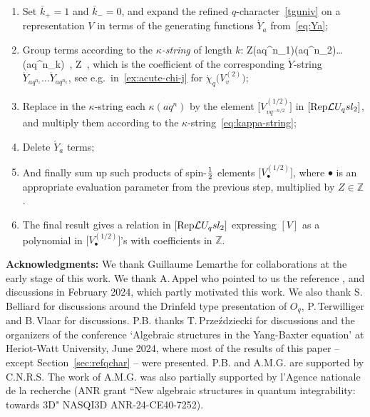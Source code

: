 \documentclass[11pt]{amsart}
\numberwithin{equation}{section}
\numberwithin{equation}{section}
\begin{document}
  \begin{enumerate}
      \item Set $\bar{k}_+=1$ and $\bar{k}_-=0$, and expand the refined $q$-character~\eqref{tguniv} on a representation $V$ in terms of the generating functions $\acute{Y}_a$ from~\eqref{eq:Ya};
      
      \item Group terms according to the \textit{$\kappa$-string} of length $k$: 
      \beq\label{eq:kappa-string}
      Z\kappa(aq^{n_1})\kappa(aq^{n_2})\ldots \kappa(aq^{n_k})\ , \qquad Z\in{}\ ,
      \eeq
       which is the coefficient of the corresponding $\acute{Y}$-string $\acute{Y}_{aq^{n_1}}\ldots \acute{Y}_{aq^{n_k}}$, see e.g.\ in~\eqref{ex:acute-chi-j} for $\acute{\chi}_q\big(V_v^{(2)}\big)$;
      
      \item Replace in the $\kappa$-string each $\kappa(aq^{n})$ by the element $\bigl[V_{vq^{-n/2}}^{(1/2)}\bigr]$ in $[\mathrm{Rep}\mathcal{L} U_q sl_2]$, and multiply them according to the $\kappa$-string~\eqref{eq:kappa-string};

      \item Delete $\acute{Y}_a$ terms;

      \item And finally sum up such products of spin-$\frac{1}{2}$ elements $\bigl[V_{\bullet}^{(1/2)}\bigr]$, where $\bullet$ is an appropriate evaluation parameter from the previous step, multiplied by $Z\in\mathbb{Z}$.

      \item The final result gives a relation in $[\mathrm{Rep}\mathcal{L} U_q sl_2]$ expressing $[V]$ as a polynomial in $\bigl[V_{\bullet}^{(1/2)}\bigr]$'s with coefficients in $\mathbb{Z}$.
  \end{enumerate}
         
\vspace{5mm}


{\bf Acknowledgments:} We thank Guillaume Lemarthe for collaborations at the early stage of this work. We thank A.\,Appel who pointed to us the reference \cite{P24}, and discussions in February 2024, which partly motivated this work. We also thank S.\,Belliard for discussions around the Drinfeld type presentation of $O_q$, P.\,Terwilliger and B.\,Vlaar for discussions. P.B. thanks T.\,Prze\'zdziecki for discussions and the organizers of the  conference
`Algebraic structures in the Yang-Baxter equation' at Heriot-Watt University, June
2024, where most of the results of this paper -- except Section~\ref{sec:refqchar} -- were presented.
P.B. and A.M.G.  are supported by C.N.R.S.  The work of A.M.G. was also partially supported by l'Agence nationale de la recherche
(ANR grant ``New algebraic structures in quantum integrability: towards 3D" NASQI3D ANR-24-CE40-7252).
\end{document}
